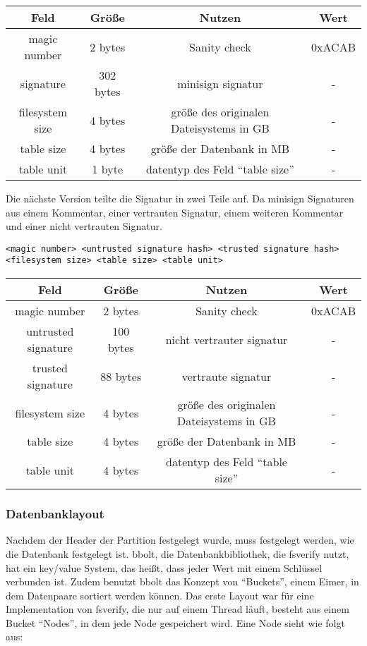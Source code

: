 \begin{center}
  \begin{tabular}{|c | c | c | c|}
    \hline
    Feld & Größe & Nutzen & Wert \\ [0.5ex]
    \hline
    magic number & 2 bytes & Sanity check & 0xACAB \\
    \hline
    signature & 302 bytes & minisign signatur & - \\
    \hline
    filesystem size & 4 bytes & größe des originalen Dateisystems in GB & - \\
    \hline
    table size & 4 bytes & größe der Datenbank in MB & - \\
    \hline
    table unit & 1 byte & datentyp des Feld ``table size'' & - \\
    \hline
  \end{tabular}
\end{center}
\hfill \break
Die nächste Version teilte die Signatur in zwei Teile auf. Da minisign Signaturen aus einem Kommentar, einer vertrauten Signatur, einem weiteren Kommentar und einer nicht vertrauten Signatur.
\begin{verbatim}
<magic number> <untrusted signature hash> <trusted signature hash>
<filesystem size> <table size> <table unit>
\end{verbatim}

\begin{center}
  \begin{tabular}{|c | c | c | c|}
    \hline
    Feld & Größe & Nutzen & Wert \\ [0.5ex]
    \hline
    magic number & 2 bytes & Sanity check & 0xACAB \\
    \hline
    untrusted signature & 100 bytes & nicht vertrauter signatur & - \\
    \hline
    trusted signature & 88 bytes & vertraute signatur & - \\
    \hline
    filesystem size & 4 bytes & größe des originalen Dateisystems in GB & - \\
    \hline
    table size & 4 bytes & größe der Datenbank in MB & - \\
    \hline
    table unit & 4 bytes & datentyp des Feld ``table size'' & - \\
    \hline
  \end{tabular}
\end{center}

\subsubsection{Datenbanklayout}
Nachdem der Header der Partition festgelegt wurde, muss festgelegt werden, wie die Datenbank festgelegt ist.
bbolt, die Datenbankbibliothek, die fsverify nutzt, hat ein key/value System, das heißt, dass jeder Wert mit einem Schlüssel verbunden ist. Zudem benutzt bbolt das Konzept von ``Buckets'', einem Eimer, in dem Datenpaare sortiert werden können.
\bigbreak \noindent
Das erste Layout war für eine Implementation von fsverify, die nur auf einem Thread läuft, besteht aus einem Bucket ``Nodes'', in dem jede Node gespeichert wird.
Eine Node sieht wie folgt aus:

